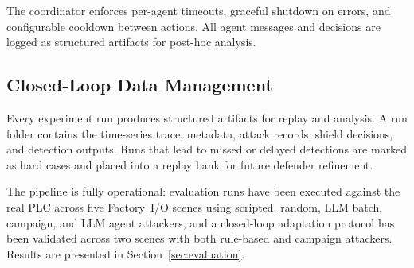 The coordinator enforces per-agent timeouts, graceful shutdown on errors, and configurable cooldown between actions. All agent messages and decisions are logged as structured artifacts for post-hoc analysis.

\subsection{Closed-Loop Data Management}

Every experiment run produces structured artifacts for replay and analysis. A run folder contains the time-series trace, metadata, attack records, shield decisions, and detection outputs. Runs that lead to missed or delayed detections are marked as hard cases and placed into a replay bank for future defender refinement.

The pipeline is fully operational: evaluation runs have been executed against the real PLC across five Factory~I/O scenes using scripted, random, LLM batch, campaign, and LLM agent attackers, and a closed-loop adaptation protocol has been validated across two scenes with both rule-based and campaign attackers. Results are presented in Section~\ref{sec:evaluation}.